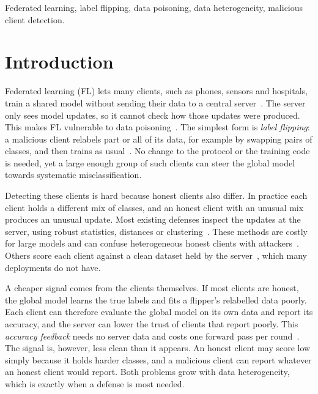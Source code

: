 \documentclass[conference]{IEEEtran}
\begin{document}
\begin{IEEEkeywords}
Federated learning, label flipping, data poisoning, data heterogeneity, malicious client detection.
\end{IEEEkeywords}

\section{Introduction}
Federated learning (FL) lets many clients, such as phones, sensors and hospitals, train a shared model without sending their data to a central server~\cite{fedavg-pmlr-v54-mcmahan17a,kairouz2021advances}. The server only sees model updates, so it cannot check how those updates were produced. This makes FL vulnerable to data poisoning~\cite{lyu2020threats}. The simplest form is \emph{label flipping}: a malicious client relabels part or all of its data, for example by swapping pairs of classes, and then trains as usual~\cite{biggio2011support,tolpegin2020data}. No change to the protocol or the training code is needed, yet a large enough group of such clients can steer the global model towards systematic misclassification.

Detecting these clients is hard because honest clients also differ. In practice each client holds a different mix of classes, and an honest client with an unusual mix produces an unusual update. Most existing defenses inspect the updates at the server, using robust statistics, distances or clustering~\cite{yin2018byzantine,NIPS2017_f4b9ec30,nguyen2022flame,jebreel2024lfighter}. These methods are costly for large models and can confuse heterogeneous honest clients with attackers~\cite{li2023hscs,shen2024lfrppfl}. Others score each client against a clean dataset held by the server~\cite{cao2020fltrust}, which many deployments do not have.

A cheaper signal comes from the clients themselves. If most clients are honest, the global model learns the true labels and fits a flipper's relabelled data poorly. Each client can therefore evaluate the global model on its own data and report its accuracy, and the server can lower the trust of clients that report poorly. This \emph{accuracy feedback} needs no server data and costs one forward pass per round~\cite{andreina2021baffle,jiang2023dataquality}. The signal is, however, less clean than it appears. An honest client may score low simply because it holds harder classes, and a malicious client can report whatever an honest client would report. Both problems grow with data heterogeneity, which is exactly when a defense is most needed.
\end{document}

